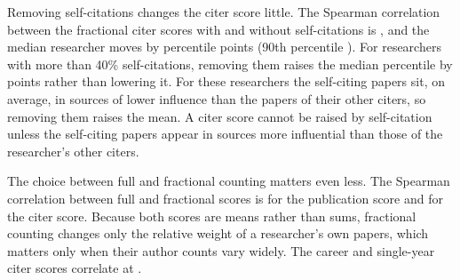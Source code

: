 Removing self-citations changes the citer score little. The Spearman correlation between the fractional citer scores with and without self-citations is \NRhoCitAllNs{}, and the median researcher moves by \NSelfShiftMed{} percentile points (90th percentile \NSelfShiftNinety{}). For researchers with more than 40\% self-citations, removing them raises the median percentile by \NSelfHiGain{} points rather than lowering it. For these researchers the self-citing papers sit, on average, in sources of lower influence than the papers of their other citers, so removing them raises the mean. A citer score cannot be raised by self-citation unless the self-citing papers appear in sources more influential than those of the researcher's other citers.

The choice between full and fractional counting matters even less. The Spearman correlation between full and fractional scores is \NRhoPubFullFrac{} for the publication score and \NRhoCitFullFrac{} for the citer score. Because both scores are means rather than sums, fractional counting changes only the relative weight of a researcher's own papers, which matters only when their author counts vary widely. The career and single-year citer scores correlate at \NRhoCitCareerSingle{}.
